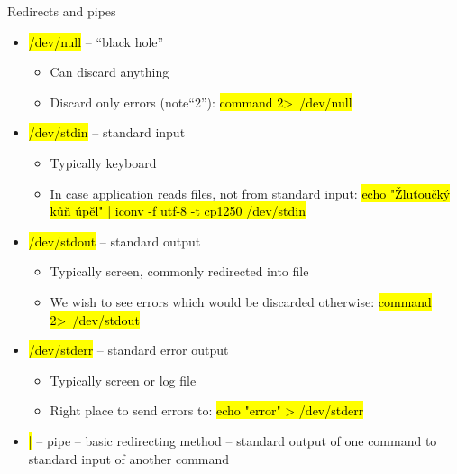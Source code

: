 \documentclass[compress, ucs, xelatex, 11pt, xcolor=svgnames,
  hyperref={
    bookmarks=true,
    unicode=true,
    colorlinks=true,
    pdftitle={Linux, command line and MetaCentrum},
    plainpages=false,
    pdfauthor={Vojtech Zeisek},
    pdfsubject={Course about use of Linux command line, writing shell scripts and using MetaCentrum of CESNET},
    pdfcreator={XeLaTeX},
    pdfkeywords={Linux, GNU, BASH, shell, command line, MetaCentrum},
    linkcolor=DarkRed,
    anchorcolor=DarkBlue,
    citecolor=Indigo,
    filecolor=NavyBlue,
    menucolor=DarkMagenta,
    urlcolor=DarkBlue,
    pdftex},
  url={hyphens, lowtilde} %
  ]{beamer}
\renewcommand{\texttt}[1]{\hl{\ttfamily #1}}
\begin{document}
\begin{frame}{Redirects and pipes}
  \label{pipe}
  \begin{itemize}
    \item \texttt{/dev/null} -- ``black hole''
    \begin{itemize}
      \item Can discard anything
      \item Discard only errors (note``2''): \texttt{command 2\textgreater~/dev/null}
    \end{itemize}
    \item \texttt{/dev/stdin} -- standard input
    \begin{itemize}
      \item Typically keyboard
      \item In case application reads files, not from standard input: \texttt{echo "Žluťoučký kůň úpěl" | iconv -f utf-8 -t cp1250 /dev/stdin}
    \end{itemize}
    \item \texttt{/dev/stdout} -- standard output
    \begin{itemize}
      \item Typically screen, commonly redirected into file
      \item We wish to see errors which would be discarded otherwise: \texttt{command 2\textgreater~/dev/stdout}
    \end{itemize}
    \item \texttt{/dev/stderr} -- standard error output
    \begin{itemize}
      \item Typically screen or log file
      \item Right place to send errors to: \texttt{echo "error" > /dev/stderr}
    \end{itemize}
    \item \texttt{|} -- pipe -- basic redirecting method -- standard output of one command to standard input of another command
  \end{itemize}
\end{frame}
\end{document}
